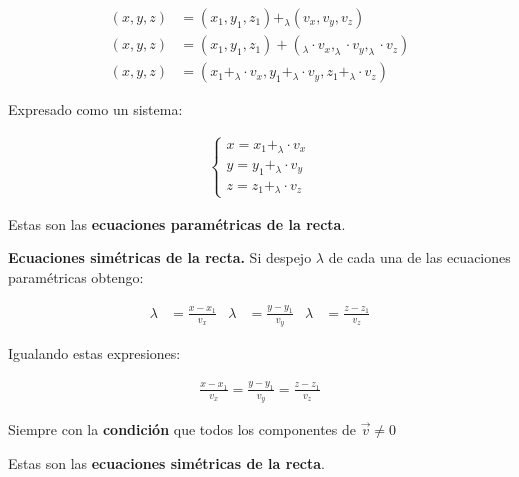 \documentclass{article}
\begin{document}
\begin{align*}
    (x, y, z) & = (x_1,y_1,z_1) + _\lambda (v_x, v_y, v_z)\\
    (x, y, z) & = (x_1,y_1,z_1) + (_\lambda \cdot v_x, _\lambda \cdot v_y,_\lambda \cdot v_z)\\
    (x, y, z) & = (x_1 + _\lambda \cdot v_x, y_1 + _\lambda \cdot v_y, z_1 + _\lambda \cdot v_z)
\end{align*}

Expresado como un sistema:

\begin{align*}
    \begin{cases}
        x = x_1 + _\lambda \cdot v_x\\
        y = y_1 + _\lambda \cdot v_y\\
        z = z_1 + _\lambda \cdot v_z
    \end{cases}
\end{align*}

Estas son las \textbf{ecuaciones paramétricas de la recta}.

\textbf{Ecuaciones simétricas de la recta.} Si despejo \(\lambda\) de cada una
de las ecuaciones paramétricas obtengo:

\begin{align*}
    \lambda & = \frac{x - x_1}{v_x} & \lambda & = \frac{y - y_1}{v_y} & \lambda & = \frac{z - z_1}{v_z}
\end{align*}

Igualando estas expresiones:

\begin{align*}
    \frac{x - x_1}{v_x} = \frac{y - y_1}{v_y} = \frac{z - z_1}{v_z}
\end{align*}

Siempre con la \textbf{condición} que todos los componentes de \(\vec{v} \neq 0\)

Estas son las \textbf{ecuaciones simétricas de la recta}.
\end{document}
